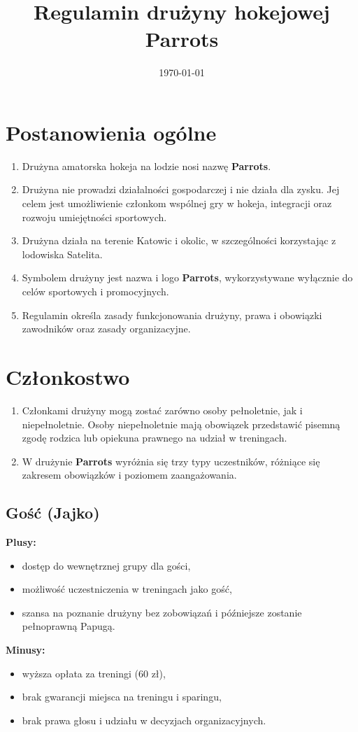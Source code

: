 \documentclass[12pt,a4paper]{article}
\title{Regulamin drużyny hokejowej Parrots}
\date{\today}
\let\stdsection\section
\renewcommand\section{\clearpage\stdsection}
\begin{document}
\maketitle
\tableofcontents

\section{Postanowienia ogólne}
\begin{enumerate}
  \item Drużyna amatorska hokeja na lodzie nosi nazwę \textbf{Parrots}.
  \item Drużyna nie prowadzi działalności gospodarczej i nie działa dla zysku. Jej celem jest umożliwienie członkom wspólnej gry w hokeja, integracji oraz rozwoju umiejętności sportowych.
  \item Drużyna działa na terenie Katowic i okolic, w szczególności korzystając z lodowiska Satelita.
  \item Symbolem drużyny jest nazwa i logo \textbf{Parrots}, wykorzystywane wyłącznie do celów sportowych i promocyjnych.
  \item Regulamin określa zasady funkcjonowania drużyny, prawa i obowiązki zawodników oraz zasady organizacyjne.
\end{enumerate}

\section{Członkostwo}
\begin{enumerate}
  \item Członkami drużyny mogą zostać zarówno osoby pełnoletnie, jak i niepełnoletnie. Osoby niepełnoletnie mają obowiązek przedstawić pisemną zgodę rodzica lub opiekuna prawnego na udział w treningach.
  \item W drużynie \textbf{Parrots} wyróżnia się trzy typy uczestników, różniące się zakresem obowiązków i poziomem zaangażowania.
\end{enumerate}

\subsection{Gość (Jajko)}
\textbf{Plusy:}
\begin{itemize}
    \item dostęp do wewnętrznej grupy dla gości,
    \item możliwość uczestniczenia w treningach jako gość,
    \item szansa na poznanie drużyny bez zobowiązań i późniejsze zostanie pełnoprawną Papugą.
\end{itemize}
\textbf{Minusy:}
\begin{itemize}
    \item wyższa opłata za treningi (60 zł),
    \item brak gwarancji miejsca na treningu i sparingu,
    \item brak prawa głosu i udziału w decyzjach organizacyjnych.
\end{itemize}
\end{document}
